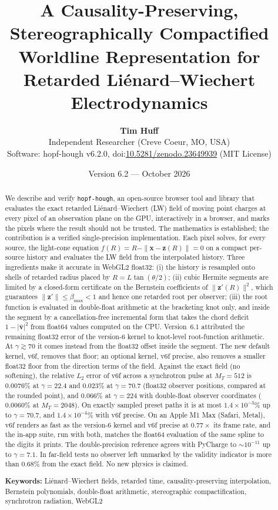 \documentclass[11pt, a4paper]{article}
\title{\textbf{A Causality-Preserving, Stereographically Compactified Worldline Representation for Retarded Li\'enard--Wiechert Electrodynamics}}
\author{\textbf{Tim Huff} \\ \small Independent Researcher (Creve Coeur, MO, USA) \\ \small Software: hopf-hough v6.2.0, doi:\href{https://doi.org/10.5281/zenodo.23649939}{10.5281/zenodo.23649939} (MIT License)}
\date{Version 6.2 --- October 2026}
\begin{document}
\maketitle

\begin{abstract}
\noindent We describe and verify \texttt{hopf-hough}, an open-source browser tool and library that evaluates the exact retarded Li\'enard--Wiechert (LW) field of moving point charges at every pixel of an observation plane on the GPU, interactively in a browser, and marks the pixels where the result should not be trusted. The mathematics is established; the contribution is a verified single-precision implementation. Each pixel solves, for every source, the light-cone equation $f(R) = R - \|\mathbf{x} - \mathbf{z}(R)\| = 0$ on a compact per-source history and evaluates the LW field from the interpolated history. Three ingredients make it accurate in WebGL2 float32: (i) the history is resampled onto shells of retarded radius placed by $R = L\tan(\theta/2)$; (ii) cubic Hermite segments are limited by a closed-form certificate on the Bernstein coefficients of $\|\mathbf{z}'(R)\|^2$, which guarantees $\|\mathbf{z}'\| \le \beta_{\max} < 1$ and hence one retarded root per observer; (iii) the root function is evaluated in double-float arithmetic at the bracketing knot only, and inside the segment by a cancellation-free incremental form that takes the chord deficit $1 - |\bar{\mathbf{v}}|^2$ from float64 values computed on the CPU. Version~6.1 attributed the remaining float32 error of the version-6 kernel to knot-level root-function arithmetic. At $\gamma \gtrsim 70$ it comes instead from the float32 offset inside the segment. The new default kernel, v6f, removes that floor; an optional kernel, v6f precise, also removes a smaller float32 floor from the direction terms of the field. Against the exact field (no softening), the relative $L_2$ error of v6f across a synchrotron pulse at $M_T = 512$ is $0.0076\%$ at $\gamma = 22.4$ and $0.023\%$ at $\gamma = 70.7$ (float32 observer positions, compared at the rounded point), and $0.066\%$ at $\gamma = 224$ with double-float observer coordinates ($0.0060\%$ at $M_T = 2048$). On exactly sampled preset paths it is at most $1.4\times10^{-3}\%$ up to $\gamma = 70.7$, and $1.4\times10^{-4}\%$ with v6f precise. On an Apple M1 Max (Safari, Metal), v6f renders as fast as the version-6 kernel and v6f precise at $0.77\times$ its frame rate, and the in-app suite, run with both, matches the float64 evaluation of the same spline to the digits it prints. The double-precision reference agrees with PyCharge to $\sim\!10^{-11}$ up to $\gamma = 7.1$. In far-field tests no observer left unmarked by the validity indicator is more than $0.68\%$ from the exact field. No new physics is claimed.

\vspace{0.15cm}
\noindent \textbf{Keywords:} Li\'enard--Wiechert fields, retarded time, causality-preserving interpolation, Bernstein polynomials, double-float arithmetic, stereographic compactification, synchrotron radiation, WebGL2
\end{abstract}
\end{document}
